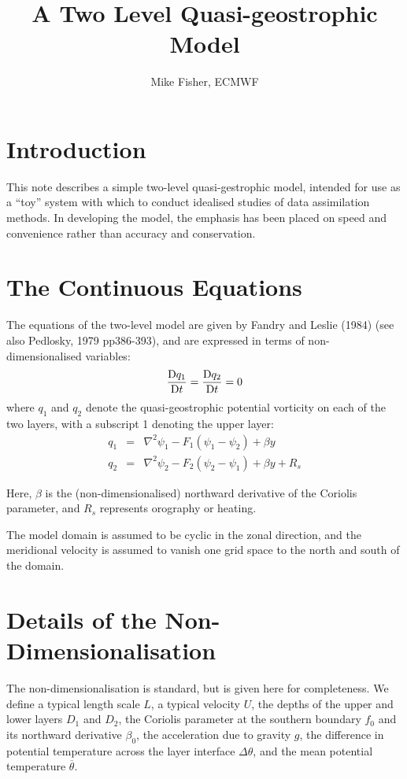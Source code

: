 \documentclass[12pt]{article}
\title{A Two Level Quasi-geostrophic Model}
\author{Mike Fisher, ECMWF}
\begin{document}
\maketitle

\section{Introduction}
This note describes a simple two-level quasi-gestrophic model, intended
for use as a ``toy'' system with which to conduct idealised studies of
data assimilation methods. In developing the model, the emphasis has been
placed on speed and convenience rather than accuracy and conservation.

\section{The Continuous Equations}
The equations of the two-level model are given by Fandry and Leslie (1984)
(see also Pedlosky, 1979 pp386-393), and are expressed in terms of
non-dimensionalised variables:
\begin{equation}
  \frac{{\rm D}q_1}{{\rm D}t} = \frac{{\rm D}q_2}{{\rm D}t} = 0
\end{equation}
where $q_1$ and $q_2$ denote the quasi-geostrophic potential vorticity
on each of the two layers, with a subscript 1 denoting the upper layer:
\begin{eqnarray}
q_1 &=& \nabla^2 \psi_1 - F_1 (\psi_1 -\psi_2 ) + \beta y \label{q_1}\\
q_2 &=& \nabla^2 \psi_2 - F_2 (\psi_2 -\psi_1 ) + \beta y + R_s \label{q_2}
\end{eqnarray}

Here, $\beta$ is the (non-dimensionalised) northward derivative of the
Coriolis parameter, and $R_s$ represents orography or heating.

The model domain is assumed to be cyclic in the zonal direction, and
the meridional velocity is assumed to vanish one grid space to the
north and south of the domain.

\section{Details of the Non-Dimensionalisation}
The non-dimensionalisation is standard, but is given here for completeness.
We define a typical length scale $L$, a typical velocity $U$, the depths
of the upper and lower layers $D_1$ and $D_2$, the Coriolis parameter
at the southern boundary $f_0$ and its northward derivative $\beta_0$,
the acceleration due to gravity $g$, the difference in potential
temperature across the layer interface $\Delta\theta$, and the mean
potential temperature $\overline\theta$.
\end{document}
